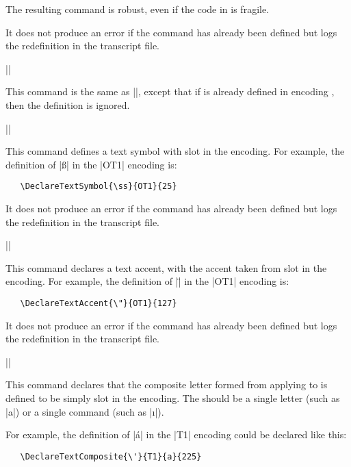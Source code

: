 \documentclass{ltxguide}[1995/11/28]
\begin{document}
The resulting command is robust, even if the code in  is
fragile.

It does not produce an error if the command has already been defined but
logs the redefinition in the transcript file.

\begin{decl}[1994/12/01]
  |\ProvideTextCommand|  
                          
\end{decl}
This command is the same as |\DeclareTextCommand|, except that if
 is already defined in encoding , then the definition
is ignored.

\begin{decl}
  |\DeclareTextSymbol|   
\end{decl}
This command defines a text symbol with slot  in the encoding.
For example, the definition of |\ss| in the |OT1| encoding is:
\begin{verbatim}
   \DeclareTextSymbol{\ss}{OT1}{25}
\end{verbatim}
It does not produce an error if the command has already
been defined but logs the redefinition in the transcript file.

\begin{decl}
  |\DeclareTextAccent|   
\end{decl}
This command declares a text accent, with the accent taken from slot
 in the encoding.  For example, the definition of |\"| in the
|OT1| encoding is:
\begin{verbatim}
   \DeclareTextAccent{\"}{OT1}{127}
\end{verbatim}
It does not produce an error if the command has already been defined but
logs the redefinition in the transcript file.

\begin{decl}
  |\DeclareTextComposite|   
\end{decl}
This command declares that the composite letter formed from applying
 to  is defined to be simply slot  in the
encoding.  The  should be a single letter (such as |a|) or a
single command (such as |\i|).

For example, the definition of |\'{a}| in the |T1| encoding could be
declared like this:
\begin{verbatim}
   \DeclareTextComposite{\'}{T1}{a}{225}
\end{verbatim}
\end{document}
